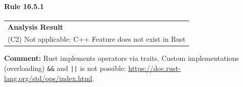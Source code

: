 \paragraph{Rule 16.5.1}
\begin{longtable}{p{13cm}}
\textbf{Analysis Result} \\
(C2) Not applicable: C++ Feature does not exist in Rust \\
\end{longtable}
\textbf{Comment:} Rust implements operators via traits. Custom implementations (overloading) \texttt{\&\&} and \texttt{||} is not possible: \url{https://doc.rust-lang.org/std/ops/index.html}. \\
